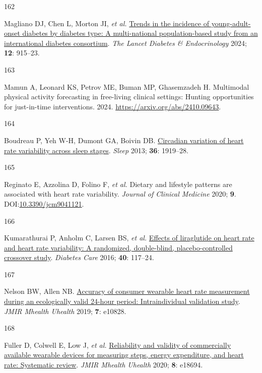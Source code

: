 \documentclass[
  a4paper,
  headsepline=true,
  open=any]{scrbook}
\newlength{\cslhangindent}
\newlength{\csllabelwidth}
\newlength{\cslentryspacingunit} %
\newenvironment{CSLReferences}[2] %
 {%
  \setlength{\parindent}{0pt}
  \ifodd #1
  \let\oldpar\par
  \def\par{\hangindent=\cslhangindent\oldpar}
  \fi
  \setlength{\parskip}{#2\cslentryspacingunit}
 }%
 {}
\newcommand{\CSLLeftMargin}[1]{\parbox[t]{\csllabelwidth}{#1}}
\newcommand{\CSLRightInline}[1]{\parbox[t]{\linewidth - \csllabelwidth}{#1}\break}
\begin{document}
\begin{CSLReferences}{0}{0}
\leavevmode{}%
\CSLLeftMargin{162 }%
\CSLRightInline{Magliano DJ, Chen L, Morton JI, \emph{et al.}
\href{https://doi.org/10.1016/S2213-8587(24)00243-2}{Trends in the
incidence of young-adult-onset diabetes by diabetes type: A
multi-national population-based study from an international diabetes
consortium}. \emph{The Lancet Diabetes \& Endocrinology} 2024;
\textbf{12}: 915--23.}

\leavevmode{}%
\CSLLeftMargin{163 }%
\CSLRightInline{Mamun A, Leonard KS, Petrov ME, Buman MP, Ghasemzadeh H.
Multimodal physical activity forecasting in free-living clinical
settings: Hunting opportunities for just-in-time interventions. 2024.
\url{https://arxiv.org/abs/2410.09643}.}

\leavevmode{}%
\CSLLeftMargin{164 }%
\CSLRightInline{Boudreau P, Yeh W-H, Dumont GA, Boivin DB.
\href{https://doi.org/10.5665/sleep.3230}{Circadian variation of heart
rate variability across sleep stages}. \emph{Sleep} 2013; \textbf{36}:
1919--28.}

\leavevmode{}%
\CSLLeftMargin{165 }%
\CSLRightInline{Reginato E, Azzolina D, Folino F, \emph{et al.} Dietary
and lifestyle patterns are associated with heart rate variability.
\emph{Journal of Clinical Medicine} 2020; \textbf{9}.
DOI:\href{https://doi.org/10.3390/jcm9041121}{10.3390/jcm9041121}.}

\leavevmode{}%
\CSLLeftMargin{166 }%
\CSLRightInline{Kumarathurai P, Anholm C, Larsen BS, \emph{et al.}
\href{https://doi.org/10.2337/dc16-1580}{Effects of liraglutide on heart
rate and heart rate variability: A randomized, double-blind,
placebo-controlled crossover study}. \emph{Diabetes Care} 2016;
\textbf{40}: 117--24.}

\leavevmode{}%
\CSLLeftMargin{167 }%
\CSLRightInline{Nelson BW, Allen NB.
\href{https://doi.org/10.2196/10828}{Accuracy of consumer wearable heart
rate measurement during an ecologically valid 24-hour period:
Intraindividual validation study}. \emph{JMIR Mhealth Uhealth} 2019;
\textbf{7}: e10828.}

\leavevmode{}%
\CSLLeftMargin{168 }%
\CSLRightInline{Fuller D, Colwell E, Low J, \emph{et al.}
\href{https://doi.org/10.2196/18694}{Reliability and validity of
commercially available wearable devices for measuring steps, energy
expenditure, and heart rate: Systematic review}. \emph{JMIR Mhealth
Uhealth} 2020; \textbf{8}: e18694.}


\end{CSLReferences}
\end{document}
